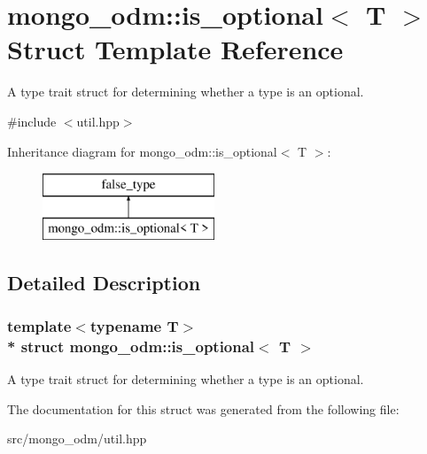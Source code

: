 \hypertarget{structmongo__odm_1_1is__optional}{}\section{mongo\+\_\+odm\+:\+:is\+\_\+optional$<$ T $>$ Struct Template Reference}
\label{structmongo__odm_1_1is__optional}


A type trait struct for determining whether a type is an optional.  




{\ttfamily \#include $<$util.\+hpp$>$}

Inheritance diagram for mongo\+\_\+odm\+:\+:is\+\_\+optional$<$ T $>$\+:\begin{figure}[H]
\begin{center}
\leavevmode
\includegraphics[height=2.000000cm]{structmongo__odm_1_1is__optional}
\end{center}
\end{figure}


\subsection{Detailed Description}
\subsubsection*{template$<$typename T$>$\\*
struct mongo\+\_\+odm\+::is\+\_\+optional$<$ T $>$}

A type trait struct for determining whether a type is an optional. 

The documentation for this struct was generated from the following file\+:\begin{DoxyCompactItemize}
\item 
src/mongo\+\_\+odm/util.\+hpp\end{DoxyCompactItemize}
